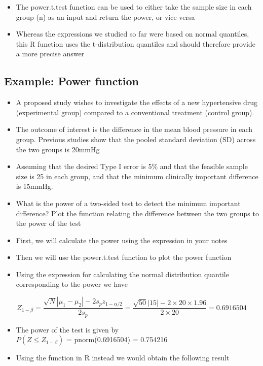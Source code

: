 \documentclass[
]{book}
\providecommand{\tightlist}{%
  \setlength{\itemsep}{0pt}\setlength{\parskip}{0pt}}
\begin{document}
\begin{itemize}
\tightlist
\item
  The power.t.test function can be used to either take the sample size in each group (n) as an input and return the power, or vice-versa
\item
  Whereas the expressions we studied so far were based on normal quantiles, this R function uses the t-distribution quantiles and should therefore provide a more precise answer
\end{itemize}

\hypertarget{example-power-function-1}{%
\subsection{Example: Power function}\label{example-power-function-1}}

\begin{itemize}
\item
  A proposed study wishes to investigate the effects of a new hypertensive drug (experimental group) compared to a conventional treatment (control group).
\item
  The outcome of interest is the difference in the mean blood pressure in each group. Previous studies show that the pooled standard deviation (SD) across the two groups is 20mmHg
\item
  Assuming that the desired Type I error is 5\% and that the feasible sample size is 25 in each group, and that the minimum clinically important difference is 15mmHg.
\item
  What is the power of a two-sided test to detect the minimum important difference? Plot the function relating the difference between the two groups to the power of the test
\item
  First, we will calculate the power using the expression in your notes
\item
  Then we will use the power.t.test function to plot the power function
\item
  Using the expression for calculating the normal distribution quantile corresponding to the power we have
\end{itemize}

\[Z_{1-\beta}=\frac{\sqrt N|\mu_1-\mu_2|-2s_pz_{1-\alpha/2}}{2s_p}=\frac{\sqrt{50}|15|-2\times 20\times 1.96}{2\times 20}=0.6916504\]

\begin{itemize}
\tightlist
\item
  The power of the test is given by\\
  \(P(Z\leq Z_{1-\beta})\) = pnorm(0.6916504) = 0.754216
\item
  Using the function in R instead we would obtain the following result
\end{itemize}
\end{document}
